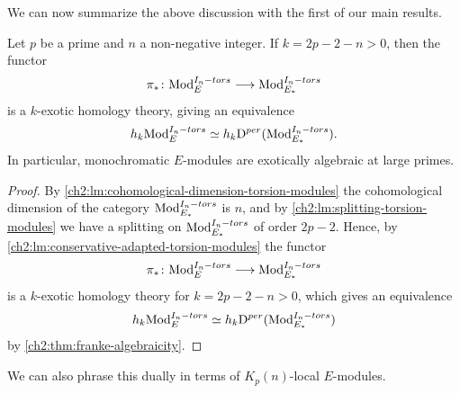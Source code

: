 
We can now summarize the above discussion with the first of our main results. 

\begin{theorem}
    \label{ch2:thm:main-modules}
    Let $p$ be a prime and $n$ a non-negative integer. If $k=2p-2-n>0$, then the functor 
    $$\pi_*\colon \mathrm{Mod}_{E}^{I_n-tors}\longrightarrow\mathrm{Mod}_{E_*}^{I_n-tors}$$
    is a $k$-exotic homology theory, giving an equivalence 
    $$h_k \mathrm{Mod}_{E}^{I_n-tors} \simeq h_k \mathrm{D}^{per}(\mathrm{Mod}_{E_*}^{I_n-tors}).$$
    In particular, monochromatic $E$-modules are exotically algebraic at large primes. 
\end{theorem}
\begin{proof}
    By \cref{ch2:lm:cohomological-dimension-torsion-modules} the cohomological dimension of the category $\mathrm{Mod}_{E_*}^{I_n-tors}$ is $n$, and by \cref{ch2:lm:splitting-torsion-modules} we have a splitting on $\mathrm{Mod}_{E_*}^{I_n-tors}$ of order $2p-2$. Hence, by \cref{ch2:lm:conservative-adapted-torsion-modules} the functor $$\pi_*\colon \mathrm{Mod}_{E}^{I_n-tors} \longrightarrow \mathrm{Mod}_{E_*}^{I_n-tors}$$
    is a $k$-exotic homology theory for $k=2p-2-n>0$, which gives an equivalence 
    $$h_k \mathrm{Mod}_{E}^{I_n-tors} \simeq h_k \mathrm{D}^{per}(\mathrm{Mod}_{E_*}^{I_n-tors})$$
    by \cref{ch2:thm:franke-algebraicity}.
\end{proof}

We can also phrase this dually in terms of $K_p(n)$-local $E$-modules. 

